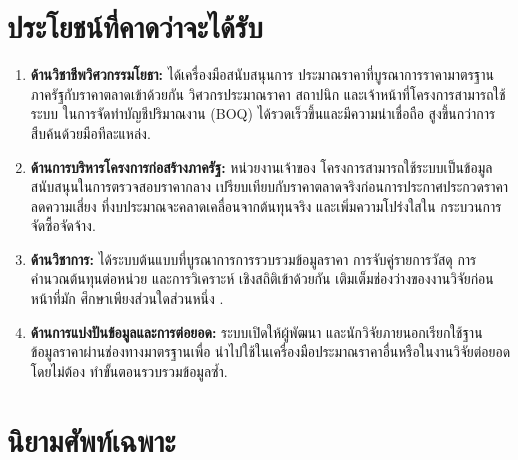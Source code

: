 \section{ประโยชน์ที่คาดว่าจะได้รับ}
\label{sec:benefit}

\begin{enumerate}[leftmargin=2em]
  \item \textbf{ด้านวิชาชีพวิศวกรรมโยธา:} ได้เครื่องมือสนับสนุนการ
        ประมาณราคาที่บูรณาการราคามาตรฐานภาครัฐกับราคาตลาดเข้าด้วยกัน
        วิศวกรประมาณราคา สถาปนิก และเจ้าหน้าที่โครงการสามารถใช้ระบบ
        ในการจัดทำบัญชีปริมาณงาน (BOQ) ได้รวดเร็วขึ้นและมีความน่าเชื่อถือ
        สูงขึ้นกว่าการสืบค้นด้วยมือทีละแหล่ง.
  \item \textbf{ด้านการบริหารโครงการก่อสร้างภาครัฐ:} หน่วยงานเจ้าของ
        โครงการสามารถใช้ระบบเป็นข้อมูลสนับสนุนในการตรวจสอบราคากลาง
        เปรียบเทียบกับราคาตลาดจริงก่อนการประกาศประกวดราคา ลดความเสี่ยง
        ที่งบประมาณจะคลาดเคลื่อนจากต้นทุนจริง และเพิ่มความโปร่งใสใน
        กระบวนการจัดซื้อจัดจ้าง.
  \item \textbf{ด้านวิชาการ:} ได้ระบบต้นแบบที่บูรณาการการรวบรวมข้อมูลราคา
        การจับคู่รายการวัสดุ การคำนวณต้นทุนต่อหน่วย และการวิเคราะห์
        เชิงสถิติเข้าด้วยกัน เติมเต็มช่องว่างของงานวิจัยก่อนหน้าที่มัก
        ศึกษาเพียงส่วนใดส่วนหนึ่ง \cite{rao2015,chunyaem2019,liu2024}.
  \item \textbf{ด้านการแบ่งปันข้อมูลและการต่อยอด:} ระบบเปิดให้ผู้พัฒนา
        และนักวิจัยภายนอกเรียกใช้ฐานข้อมูลราคาผ่านช่องทางมาตรฐานเพื่อ
        นำไปใช้ในเครื่องมือประมาณราคาอื่นหรือในงานวิจัยต่อยอด โดยไม่ต้อง
        ทำขั้นตอนรวบรวมข้อมูลซ้ำ.
\end{enumerate}

\section{นิยามศัพท์เฉพาะ}
\label{sec:definitions}

